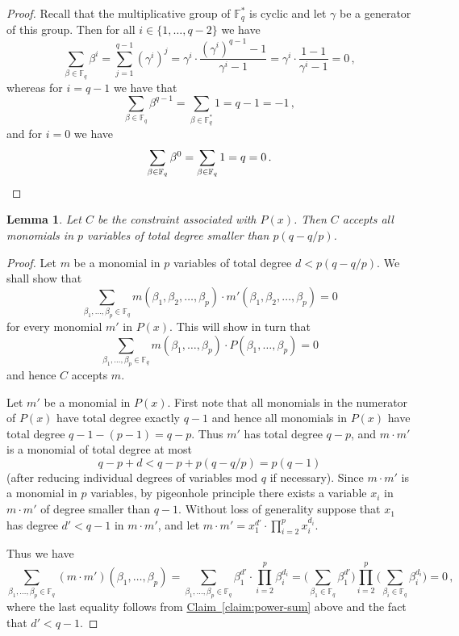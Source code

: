 \documentclass[10pt]{article}
\newtheorem{lemma}[theorem]{Lemma}
\theoremstyle{definition}
\numberwithin{equation}{section}
\newcommand{\expref}[2]{\texorpdfstring{\hyperref[#2]{#1~\ref{#2}}}{#1~\ref{#2}}}
\newcommand{\F}{{\mathbb{F}}}
\begin{document}
\begin{proof}
Recall that the multiplicative group of $\F_q^*$ is cyclic and let $\gamma$ be a generator of this group. Then for all $i \in \{1,\ldots,q-2\}$ we have
$$\sum_{\beta \in \F_q} \beta^i = \sum_{j=1}^{q-1} (\gamma^i)^j = \gamma^i \cdot \frac {(\gamma^i)^{q-1} - 1} {\gamma^i -1} =  \gamma^i \cdot \frac {1- 1} {\gamma^i -1} =0\,, $$
whereas for $i = q-1$ we have that
\[\sum_{\beta \in \F_q} \beta^{q-1} = \sum_{\beta \in \F_q^*} 1 = q-1 = -1\,,\]
and for $i=0$ we have
\[\sum_{\beta \in \F_q} \beta^{0} = \sum_{\beta \in \F_q} 1 = q = 0\,.\qedhere\]
\end{proof}

\begin{lemma}\label{lem:tech-lem-accept}
Let $C$ be the constraint associated with $P(x)$. Then $C$ accepts all monomials in $p$ variables of total degree smaller than $p(q-q/p)$.
\end{lemma}

\begin{proof}
Let $m$ be a monomial in $p$ variables of total degree $d < p (q-q/p)$. We shall show that $$\sum_{\beta_1,\ldots, \beta_p \in \F_q} m(\beta_1,\beta_2,\ldots,\beta_p)  \cdot m'(\beta_1,\beta_2,\ldots, \beta_p)=0 $$ for every monomial $m'$ in $P(x)$. This will show in turn that $$\sum_{\beta_1,\ldots,\beta_p \in \F_q} m(\beta_1,\ldots,\beta_p) \cdot P(\beta_1,\ldots,\beta_p) =0$$ and hence $C$ accepts $m$.

Let $m'$ be a monomial in $P(x)$. First note that all monomials in the numerator of $P(x)$ have total degree exactly $q-1$ and hence all monomials
in $P(x)$ have total degree $q-1-(p-1)=q-p$. Thus $m'$ has total degree $q-p$, and $m \cdot m'$ is a monomial of total degree at most
$$q-p +d <
q-p + p(q-q/p) = p(q-1)$$ (after reducing individual degrees of variables mod $q$ if necessary).  Since $m \cdot m'$ is a monomial in $p$ variables, by pigeonhole principle there exists a variable $x_i$ in $m \cdot m'$ of degree smaller than $q-1$. Without loss of generality suppose that $x_1$ has degree $d' < q-1$ in $m \cdot m'$, and let $m \cdot m' = x_1^{d'} \cdot
\prod_{i=2}^{p} x_i^{d_i}$.

Thus we have
%
%
\begin{equation*}
 \sum_{\beta_1,\ldots,\beta_p \in \F_q} (m \cdot m') (\beta_1,\ldots,\beta_p)   = 
 \sum_{\beta_1,\ldots,\beta_p \in \F_q}  \beta_1^{d'} \cdot  \prod_{i=2}^{p} \beta_i^{d_i}  
 =  \bigg(\sum_{\beta_1 \in \F_q} \beta_1^{d'}\bigg) \prod_{i=2}^p \bigg( \sum_{\beta_i \in \F_q} \beta_i^{d_i}\bigg)
  =  0\,,
  \end{equation*}
%
%
where the last equality follows from \expref{Claim}{claim:power-sum} above and the fact that $d' <q-1$.
\end{proof}
\end{document}

